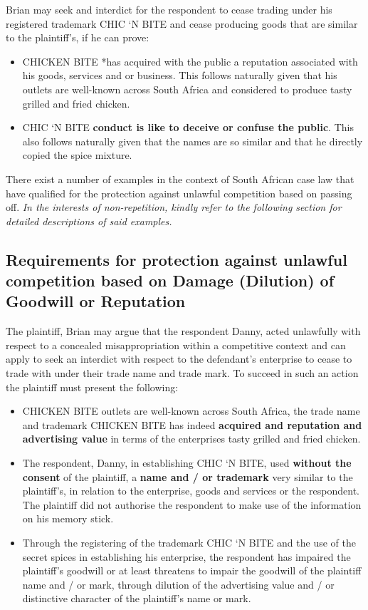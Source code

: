 \documentclass[11pt]{article}
\begin{document}
Brian may seek and interdict for the respondent to cease trading under his
registered trademark CHIC `N BITE and cease producing goods that are similar to
the plaintiff's, if he can prove:
\begin{itemize}
\item CHICKEN BITE *has acquired with the public a reputation associated
with his goods, services and or business. This follows naturally given that
his outlets are well-known across South Africa and considered to produce tasty
grilled and fried chicken.
\item CHIC `N BITE \textbf{conduct is like to deceive or confuse the public}. This also
follows naturally given that the names are so similar and that he directly
copied the spice mixture.
\end{itemize}

There exist a number of examples in the context of South African case law that have
qualified for the protection against unlawful competition based on passing
off. \emph{In the interests of non-repetition, kindly refer to the following section for detailed descriptions of said examples.}

\subsection{Requirements for protection against unlawful competition based on Damage (Dilution) of Goodwill or Reputation}
\label{sec:org73c94bf}
The plaintiff, Brian may argue that the respondent Danny, acted unlawfully with
respect to a concealed misappropriation within a competitive context and can
apply to seek an interdict with respect to the defendant's enterprise
to cease to trade with under their trade name and trade mark. To succeed in
such an action the plaintiff must present the following:
\begin{itemize}
\item CHICKEN BITE outlets are well-known across South Africa, the trade name and
trademark CHICKEN BITE has indeed \textbf{acquired and reputation and advertising
value} in terms of the enterprises tasty grilled and fried chicken.
\item The respondent, Danny, in establishing CHIC `N BITE, used \textbf{without the consent}
of the plaintiff, a \textbf{name and / or trademark} very similar to the plaintiff's,
in relation to the enterprise, goods and services or the respondent. The
plaintiff did not authorise the respondent to make use of the information on
his memory stick.
\item Through the registering of the trademark CHIC `N BITE and the use of the
secret spices in establishing his enterprise, the respondent has impaired the
plaintiff's goodwill or at least threatens to impair the goodwill of the
plaintiff name and / or mark, through dilution of the advertising value and /
or distinctive character of the plaintiff's name or mark.
\end{itemize}
\end{document}
